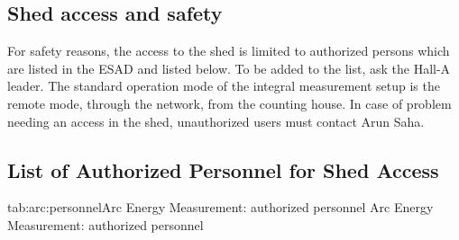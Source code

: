 \begin{safetyen}{10}{10}
\section{Shed access and safety }

For safety reasons, the access to the shed is limited to authorized
persons which are listed in the ESAD and listed below. To be added to the list, 
ask the 
Hall-A leader. 
The standard
operation mode of the integral measurement setup is the remote mode, through
the network, from the counting house. In case of problem needing an access in
the shed, unauthorized users must contact Arun Saha.
\end{safetyen}

\begin{safetyen}{10}{10}
\section{List of Authorized Personnel for Shed Access}
\end{safetyen}

\begin{namestab}{tab:arc:personnel}{Arc Energy Measurement: authorized personnel}{%
                 Arc Energy Measurement: authorized personnel}
  \DouglasHiginbotham{}
  \MichaelTiefenback{}
  \YvesRoblin{}
  \RickGonzales{}
  \BillMerz{}
  \MarkAugustine{}
  \HariAreti{}
  \PeteFrancis{}
  \ScottHiggins{}
  \DavidSeidman{}
  \RonLauze{}
  \TonyDay{}
  \PascalVernin{}
  \ChristianVeyssiere{}
  \FrancoisGougnaud{}
  \JacquesMarroncle{}
\end{namestab}


